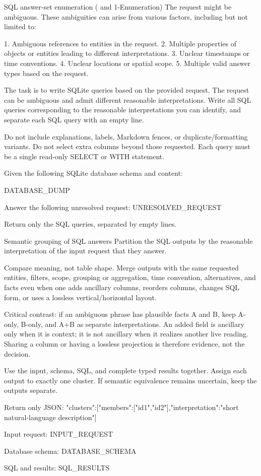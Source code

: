 \begin{promptbox}{SQL answer-set enumeration (\circleclar{} and 1-Enumeration)}
The request might be ambiguous. These ambiguities can arise from various factors, including but not limited to:

1. Ambiguous references to entities in the request.
2. Multiple properties of objects or entities leading to different interpretations.
3. Unclear timestamps or time conventions.
4. Unclear locations or spatial scope.
5. Multiple valid answer types based on the request.

The task is to write SQLite queries based on the provided request. The request can be ambiguous and admit different reasonable interpretations. Write all SQL queries corresponding to the reasonable interpretations you can identify, and separate each SQL query with an empty line.

Do not include explanations, labels, Markdown fences, or duplicate/formatting variants. Do not select extra columns beyond those requested. Each query must be a single read-only SELECT or WITH statement.

Given the following SQLite database schema and content:

DATABASE_DUMP

Answer the following unresolved request:
UNRESOLVED_REQUEST

Return only the SQL queries, separated by empty lines.
\end{promptbox}

\begin{promptbox}{Semantic grouping of SQL answers}
Partition the SQL outputs by the reasonable interpretation of the input request that they answer.

Compare meaning, not table shape. Merge outputs with the same requested entities, filters, scope, grouping or aggregation, time convention, alternatives, and facts even when one adds ancillary columns, reorders columns, changes SQL form, or uses a lossless vertical/horizontal layout.

Critical contrast: if an ambiguous phrase has plausible facts A and B, keep A-only, B-only, and A+B as separate interpretations. An added field is ancillary only when it is context; it is not ancillary when it realizes another live reading. Sharing a column or having a lossless projection is therefore evidence, not the decision.

Use the input, schema, SQL, and complete typed results together. Assign each output to exactly one cluster. If semantic equivalence remains uncertain, keep the outputs separate.

Return only JSON:
{"clusters":[{"members":["id1","id2"],"interpretation":"short natural-language description"}]}

Input request:
{{INPUT_REQUEST}}

Database schema:
{{DATABASE_SCHEMA}}

SQL and results:
{{SQL_RESULTS}}
\end{promptbox}

